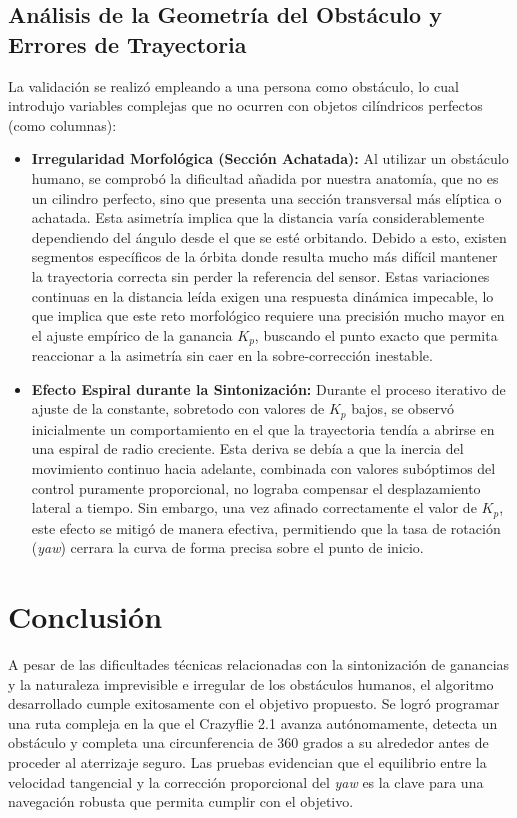 \documentclass[12pt,a4paper]{article}
\begin{document}
\subsection{Análisis de la Geometría del Obstáculo y Errores de Trayectoria}
La validación se realizó empleando a una persona como obstáculo, lo cual introdujo variables complejas que no ocurren con objetos cilíndricos perfectos (como columnas):
\begin{itemize}
    \item \textbf{Irregularidad Morfológica (Sección Achatada):} Al utilizar un obstáculo humano, se comprobó la dificultad añadida por nuestra anatomía, que no es un cilindro perfecto, sino que presenta una sección transversal más elíptica o achatada. Esta asimetría implica que la distancia varía considerablemente dependiendo del ángulo desde el que se esté orbitando. Debido a esto, existen segmentos específicos de la órbita donde resulta mucho más difícil mantener la trayectoria correcta sin perder la referencia del sensor. Estas variaciones continuas en la distancia leída exigen una respuesta dinámica impecable, lo que implica que este reto morfológico requiere una precisión mucho mayor en el ajuste empírico de la ganancia $K_p$, buscando el punto exacto que permita reaccionar a la asimetría sin caer en la sobre-corrección inestable.
    \item \textbf{Efecto Espiral durante la Sintonización:} Durante el proceso iterativo de ajuste de la constante, sobretodo con valores de $K_p$ bajos, se observó inicialmente un comportamiento en el que la trayectoria tendía a abrirse en una espiral de radio creciente. Esta deriva se debía a que la inercia del movimiento continuo hacia adelante, combinada con valores subóptimos del control puramente proporcional, no lograba compensar el desplazamiento lateral a tiempo. Sin embargo, una vez afinado correctamente el valor de $K_p$, este efecto se mitigó de manera efectiva, permitiendo que la tasa de rotación (\textit{yaw}) cerrara la curva de forma precisa sobre el punto de inicio.
\end{itemize}

\section{Conclusión}
A pesar de las dificultades técnicas relacionadas con la sintonización de ganancias y la naturaleza imprevisible e irregular de los obstáculos humanos, el algoritmo desarrollado cumple exitosamente con el objetivo propuesto. Se logró programar una ruta compleja en la que el Crazyflie 2.1 avanza autónomamente, detecta un obstáculo y completa una circunferencia de 360 grados a su alrededor antes de proceder al aterrizaje seguro. Las pruebas evidencian que el equilibrio entre la velocidad tangencial y la corrección proporcional del \textit{yaw} es la clave para una navegación robusta que permita cumplir con el objetivo.
\end{document}
